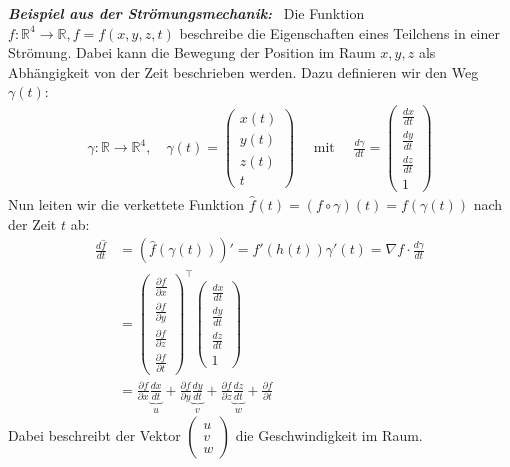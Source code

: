 \documentclass[11pt,a4paper]{book}
\newcommand {\R}	{\mathbb{R}}
\newcommand{\1}    	{\mathbbm{1}}
\newcommand{\mitt}	{\textrm{ mit }}
\newcommand{\Beispiel}[1][Anwendungsbeispiel]
{\begin{mdframed}[backgroundcolor=green!7,linewidth=0pt]\noindent\textit{\textbf{{#1}:}}~}
\newcommand{\Beispielende}	{\end{mdframed}}
\begin{document}
\Beispiel[Beispiel aus der Strömungsmechanik]
Die Funktion \(f: \R^4 \rightarrow \R, f = f(x,y,z,t) \) beschreibe die Eigenschaften eines Teilchens in einer Strömung. Dabei kann die Bewegung der Position im Raum \(x,y,z\) als Abhängigkeit von der Zeit beschrieben werden. Dazu definieren wir den Weg \(\gamma(t)\):
\begin{align*}
	\gamma: \R \rightarrow \R^4, \quad
	\gamma(t) = \left( \begin{array}{c}
		x(t) \\
		y(t) \\
		z(t) \\
		t
	\end{array} \right) \quad\mitt\quad
	\frac{d \gamma}{dt} = \left( \begin{array}{c}
		\frac{d x}{dt} \\
		\frac{d y}{dt} \\
		\frac{d z}{dt} \\
		1
	\end{array} \right)
\end{align*}
Nun leiten wir die verkettete Funktion \(\hat{f}(t) = (f \circ \gamma)(t) = f(\gamma(t))\) nach der Zeit \(t\) ab:
\begin{align*}
	\frac{d\hat{f}}{dt} &= \left( \hat{f}(\gamma(t)) \right)' = f'(h(t)) \gamma'(t) = \nabla f \cdot \frac{d\gamma}{dt} \\
	&= \left( \begin{array}{c}
		\frac{\partial f}{\partial x} \\
		\frac{\partial f}{\partial y} \\
		\frac{\partial f}{\partial z} \\
		\frac{\partial f}{\partial t}
	\end{array} \right)^\top 
	\left( \begin{array}{c}
		\frac{d x}{dt} \\
		\frac{d y}{dt} \\
		\frac{d z}{dt} \\
		1
	\end{array} \right) \\
	&= \frac{\partial f}{\partial x} \underbrace{\frac{dx}{dt}}_{u}
	+ \frac{\partial f}{\partial y} \underbrace{\frac{dy}{dt}}_{v}
	+ \frac{\partial f}{\partial z} \underbrace{\frac{dz}{dt}}_{w}
	+ \frac{\partial f}{\partial t}
\end{align*}
Dabei beschreibt der Vektor \(\left(\begin{array}{c} u \\ v \\ w \end{array}\right) \) die Geschwindigkeit im Raum.
\Beispielende
\end{document}
